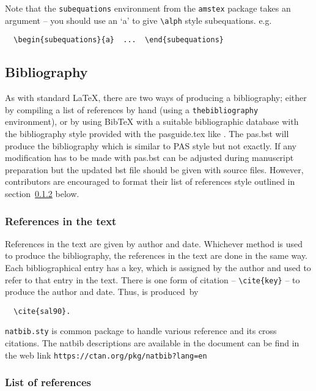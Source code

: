 \documentclass{pas}
\begin{document}
Note that the \verb"subequations" environment from the \verb"amstex" package
takes an argument -- you should use an `a' to give \verb"\alph" style
subequations. e.g.
\begin{verbatim}
  \begin{subequations}{a}  ...  \end{subequations}
\end{verbatim}

\subsection{Bibliography}

As with standard \LaTeX, there are two ways of producing a bibliography;
either by compiling a list of references by hand (using a
\verb"thebibliography" environment), or by using BibTeX with a suitable
bibliographic database with the bibliography style provided with the pasguide.tex like \verb"". The pas.bst will produce the bibliography which is similar to PAS style but not exactly. If any modification has to be made with pas.bst can be adjusted during manuscript preparation but the updated bst file should be given with source files. However, contributors are encouraged to format
their list of references style outlined in section~\ref{fullref}
below.

\subsubsection{References in the text}

References in the text are given by author and date.
Whichever method is used to produce the bibliography, the references in
the text are done in the same way. Each bibliographical entry has a key,
which is assigned by the author and used to refer to that entry in the
text. There is one form of citation -- \verb"\cite{key}" -- to produce the
author and date. Thus, \cite{sal90} is produced~by
\begin{verbatim}
  \cite{sal90}.
\end{verbatim}

\verb"natbib.sty" is common package to handle various reference and its cross citations. The natbib descriptions are available in the document can be find in the web link \verb"https://ctan.org/pkg/natbib?lang=en"

\subsubsection{List of references}\label{fullref}
\end{document}
